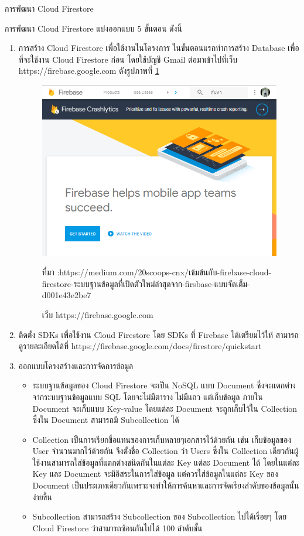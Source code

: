 การพัฒนา Cloud Firestore


การพัฒนา Cloud Firestore แบ่งออกแบบ 5 ขั้นตอน ดังนี้
\begin{enumerate}
	\item การสร้าง Cloud Firestore เพื่อใช้งานในโครงการ ในขั้นตอนแรกทำการสร้าง Database เพื่อที่จะใช้งาน Cloud Firestore ก่อน โดยใช้บัญชี Gmail ต่อมาเข้าไปที่เว็บ https://firebase.google.com  ดังรูปภาพที่ \ref{Fig:f1}
	\begin{figure}[H]
		\centering
		\includegraphics[width=0.7\columnwidth]{Figures/2/f1}
		\caption{เว็บ https://firebase.google.com}{ที่มา :https://medium.com/20scoops-cnx/เข้มข้นกับ-firebase-cloud-firestore-ระบบฐานข้อมูลที่เปิดตัวใหม่ล่าสุดจาก-firsbase-แบบจัดเต็ม-d001e43e2be7 }
		\label{Fig:f1}
	\end{figure}
	\item ติดตั้ง SDKs เพื่อใช้งาน Cloud Firestore
	โดย SDKs ที่ Firebase ได้เตรียมไว้ให้ สามารถดูรายละเอียดได้ที่ https://firebase.google.com/docs/firestore/quickstart
	\item ออกแบบโครงสร้างและการจัดการข้อมูล  
	\begin{itemize}
		\item  ระบบฐานข้อมูลของ Cloud Firestore จะเป็น NoSQL แบบ Document ซึ่งจะแตกต่างจากระบบฐานข้อมูลแบบ SQL โดยจะไม่มีตาราง ไม่มีแถว แต่เก็บข้อมูล ภายใน Document จะเก็บแบบ Key-value โดยแต่ละ Document จะถูกเก็บไว้ใน Collection ซึ่งใน Document สามารถมี Subcollection ได้
		\item Collection เป็นการเรียกชื่อแทนของการเก็บหลายๆเอกสารไว้ด้วยกัน เช่น เก็บข้อมูลของ User จำนวนมากไว้ด้วยกัน จึงตั้งชื่อ Collection ว่า Users ซึ่งใน Collection เดียวกันผู้ใช้งานสามารถใส่ข้อมูลที่แตกต่างชนิดกันในแต่ละ Key แต่ละ Document ได้ โดยในแต่ละ Key และ Document จะมีอิสระในการใส่ข้อมูล แต่ควรใส่ข้อมูลในแต่ละ Key ของ Document เป็นประเภทเดียวกันเพราะจะทำให้การค้นหาและการจัดเรียงลำดับของข้อมูลนั้นง่ายขึ้น
		\item Subcollection สามารถสร้าง Subcollection ของ Subcollection ไปได้เรื่อยๆ โดย Cloud Firestore ว่าสามารถซ้อนกันไปได้ 100 ลำดับชั้น

\end{itemize}
\end{enumerate}
